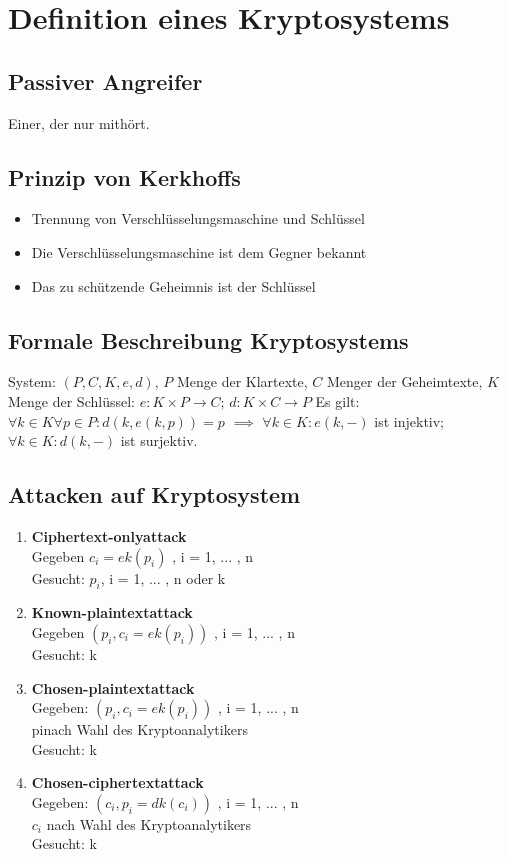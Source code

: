 \documentclass[10pt]{article}
\begin{document}
\newpage
\section{Definition eines Kryptosystems}
\subsection{Passiver Angreifer}
Einer, der nur mithört.
\subsection{Prinzip von Kerkhoffs}
\begin{itemize}
	\item Trennung von Verschlüsselungsmaschine und Schlüssel
	\item Die Verschlüsselungsmaschine ist dem Gegner bekannt
	\item Das zu schützende Geheimnis ist der Schlüssel
\end{itemize}
\subsection{Formale Beschreibung Kryptosystems}
System: $(P, C, K, e, d)$, $P$ Menge der Klartexte, $C$ Menger der Geheimtexte, $K$ Menge der Schlüssel:
$e: K \times P \rightarrow C$; $d: K \times C \rightarrow P$
Es gilt: $\forall k \in K \forall p \in P: d (k, e (k, p)) = p$ $\implies$ $\forall k \in K : e(k, -)$ ist injektiv; $\forall k \in K: d(k, -)$ ist surjektiv.
\subsection{Attacken auf Kryptosystem}
\begin{enumerate}
\item \textbf{Ciphertext-onlyattack} \\
Gegeben $c_i= ek(p_i)$ , i = 1, ... , n \\
Gesucht: $p_i$, i = 1, ... , n oder k
\item \textbf{Known-plaintextattack}\\
Gegeben $( p_i, c_i= ek(p_i))$ , i = 1, ... , n \\
Gesucht: k 
\item \textbf{Chosen-plaintextattack}\\
Gegeben: $( p_i, c_i= ek(p_i))$ , i = 1, ... , n \\
pinach Wahl des Kryptoanalytikers \\
Gesucht: k 
\item \textbf{Chosen-ciphertextattack}\\
Gegeben: $( c_i,p_i= dk(c_i))$ , i = 1, ... , n \\
$c_i$ nach Wahl des Kryptoanalytikers \\
Gesucht: k
\end{enumerate}
\end{document}
